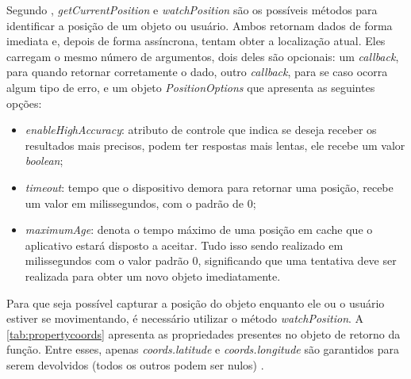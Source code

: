 Segundo , \textit{getCurrentPosition} e \textit{watchPosition} são os possíveis métodos para identificar a posição de um objeto ou usuário. Ambos retornam dados de forma imediata e, depois de forma assíncrona, tentam obter a localização atual. Eles carregam o mesmo número de argumentos, dois deles são opcionais: um \textit{callback}, para quando retornar corretamente o dado, outro \textit{callback}, para se caso ocorra algum tipo de erro, e um objeto \textit{PositionOptions} que apresenta as seguintes opções:

\newpage
\begin{itemize}
    \item \textit{enableHighAccuracy}: atributo de controle que indica se deseja receber os resultados mais precisos, podem ter respostas mais lentas, ele recebe um valor \textit{boolean};
    \item \textit{timeout}: tempo que o dispositivo demora para retornar uma posição, recebe um valor em milissegundos, com o padrão de 0;
    \item \textit{maximumAge}: denota o tempo máximo de uma posição em cache que o aplicativo estará disposto a aceitar. Tudo isso sendo realizado em milissegundos com o valor padrão 0, significando que uma tentativa deve ser realizada para obter um novo objeto imediatamente.
\end{itemize}


Para que seja possível capturar a posição do objeto enquanto ele ou o usuário estiver se movimentando, é necessário utilizar o método \textit{watchPosition}. A \autoref{tab:propertycoords} apresenta as propriedades presentes no objeto de retorno da função. Entre esses, apenas \textit{coords.latitude} e \textit{coords.longitude} são garantidos para serem devolvidos (todos os outros podem ser nulos) \cite{geolocalizacao:2011}.

